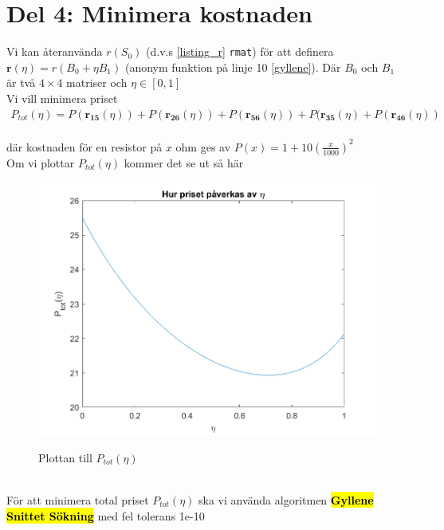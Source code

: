\documentclass{assignment}
\def\code#1{\texttt{#1}}
\begin{document}
\section*{Del 4: Minimera kostnaden}
Vi kan återanvända $r(S_0)$ (d.v.s \cref{listing_r} \code{r\textunderscore mat}) för att definera $\mathbf{r}(\eta)=r(B_0+\eta B_1)$ (anonym funktion på linje 10 \cref{gyllene}).
Där $B_0$ och $B_1$ är två $4 \times 4$ matriser och $\eta \in [0,1]$  
\\ Vi vill minimera priset 
\begin{align*}
    P_{tot}(\eta)=P(\mathbf{r_{15}}(\eta))+P(\mathbf{r_{26}}(\eta))+P(\mathbf{r_{56}}(\eta))+P(\mathbf{r_{35}}(\eta)+P(\mathbf{r_{46}}(\eta))
\end{align*}
\\ där kostnaden för en resistor på $x$ ohm ges av $P(x)=1+10(\frac{x}{1000})^2$
\\ Om vi plottar $P_{tot}(\eta)$ kommer det se ut så här
\begin{figure}[!h] 
    \caption[short]{Plottan till $P_{tot}(\eta)$}
    \begin{center}
        \includegraphics{assets/gyllene_plot.png} \label{plotta}
    \end{center}
\end{figure} 
\\För att minimera total priset $P_{tot}(\eta)$ ska vi använda algoritmen \hl{\textbf{Gyllene Snittet Sökning}} med fel tolerans 1e-10
\end{document}
